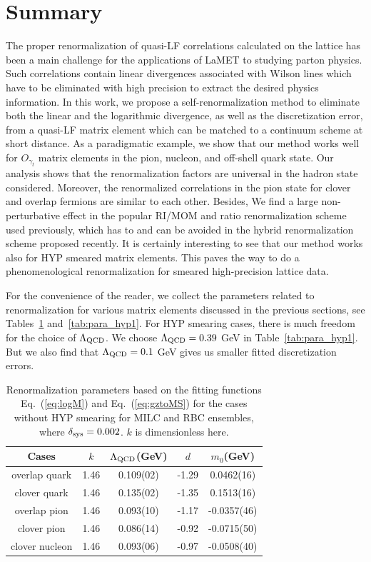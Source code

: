 \section{Summary}\label{sec:summary}

The proper renormalization of quasi-LF correlations calculated on the lattice has been a main challenge for the applications of LaMET to studying parton physics. Such correlations contain linear divergences associated with Wilson lines which have to be eliminated with high precision to extract the desired physics information. In this work, we propose a self-renormalization method to eliminate both the linear and the logarithmic divergence, as well as the discretization error, from a quasi-LF matrix element which can be matched to a continuum scheme at short distance. As a paradigmatic example, we show that our method works well for $O_{\gamma_t}$ matrix elements in the pion, nucleon, and off-shell quark state. Our analysis shows that the renormalization factors are universal in the hadron state considered. Moreover, the renormalized correlations in the pion state for clover and overlap fermions are similar to each other. Besides, We find a large non-perturbative effect in the popular RI/MOM and ratio renormalization scheme used previously, which has to and can be avoided in the hybrid renormalization scheme proposed recently. It is certainly interesting to see that our method works also for HYP smeared matrix elements. This paves the way to do a phenomenological renormalization for smeared high-precision lattice data. 

For the convenience of the reader, we collect the parameters related to renormalization for various matrix elements discussed in the previous sections, see Tables~\ref{tab:para_hyp0} and~\ref{tab:para_hyp1}. For HYP smearing cases, there is much freedom for the choice of $\Lambda_{\rm QCD}$. We choose $\Lambda_{\rm QCD}=0.39$ GeV in Table~\ref{tab:para_hyp1}. But we also find that $\Lambda_{\rm QCD}=0.1$ GeV gives us smaller fitted discretization errors.


\begin{table}[htbp]
  \centering
  \begin{tabular}{c|cccc}
  \toprule
 Cases & $k$ & $\Lambda_{\rm QCD}$(GeV) & $d$ & $m_{0}$(GeV) \\
\hline
overlap quark & 1.46 & 0.109(02) & -1.29 & 0.0462(16)\\
\hline
clover quark & 1.46 & 0.135(02) & -1.35 & 0.1513(16)\\
\hline
overlap pion & 1.46 & 0.093(10) & -1.17 & -0.0357(46)\\
\hline
clover pion & 1.46 & 0.086(14) & -0.92 &  -0.0715(50)\\
\hline
clover nucleon & 1.46 & 0.093(06) & -0.97 &  -0.0508(40)\\
\hline
  \end{tabular}
  \caption{Renormalization parameters based on the fitting functions Eq.~(\ref{eq:logM}) and Eq.~(\ref{eq:gztoMS}) for the cases without HYP smearing for MILC and RBC ensembles, where $\delta_{\rm sys}=0.002$. $k$ is dimensionless here.}
  \label{tab:para_hyp0}
\end{table}


